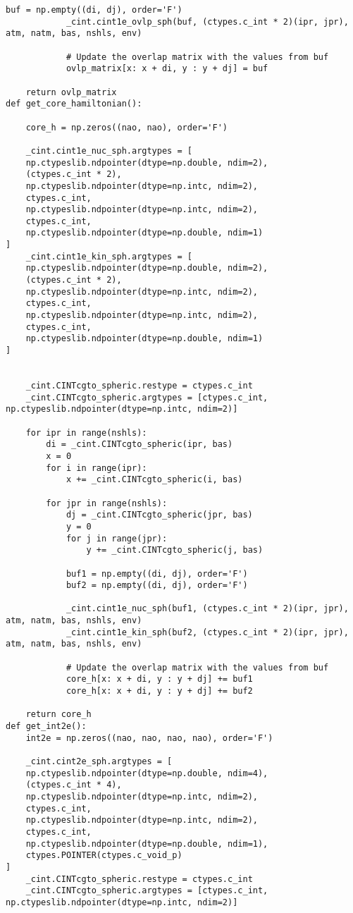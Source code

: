 \documentclass[12pt, a4paper, oneside]{ctexart}
\begin{document}
\begin{appendices}
\begin{lstlisting}[style = Python]
            buf = np.empty((di, dj), order='F')
            _cint.cint1e_ovlp_sph(buf, (ctypes.c_int * 2)(ipr, jpr), atm, natm, bas, nshls, env)

            # Update the overlap matrix with the values from buf
            ovlp_matrix[x: x + di, y : y + dj] = buf

    return ovlp_matrix
def get_core_hamiltonian():
    
    core_h = np.zeros((nao, nao), order='F')
    
    _cint.cint1e_nuc_sph.argtypes = [
    np.ctypeslib.ndpointer(dtype=np.double, ndim=2),
    (ctypes.c_int * 2),
    np.ctypeslib.ndpointer(dtype=np.intc, ndim=2),
    ctypes.c_int,
    np.ctypeslib.ndpointer(dtype=np.intc, ndim=2),
    ctypes.c_int,
    np.ctypeslib.ndpointer(dtype=np.double, ndim=1)
]
    _cint.cint1e_kin_sph.argtypes = [
    np.ctypeslib.ndpointer(dtype=np.double, ndim=2),
    (ctypes.c_int * 2),
    np.ctypeslib.ndpointer(dtype=np.intc, ndim=2),
    ctypes.c_int,
    np.ctypeslib.ndpointer(dtype=np.intc, ndim=2),
    ctypes.c_int,
    np.ctypeslib.ndpointer(dtype=np.double, ndim=1)
]
    

    _cint.CINTcgto_spheric.restype = ctypes.c_int
    _cint.CINTcgto_spheric.argtypes = [ctypes.c_int, np.ctypeslib.ndpointer(dtype=np.intc, ndim=2)]
    
    for ipr in range(nshls):
        di = _cint.CINTcgto_spheric(ipr, bas)
        x = 0
        for i in range(ipr):
            x += _cint.CINTcgto_spheric(i, bas)

        for jpr in range(nshls):
            dj = _cint.CINTcgto_spheric(jpr, bas)
            y = 0
            for j in range(jpr):
                y += _cint.CINTcgto_spheric(j, bas)

            buf1 = np.empty((di, dj), order='F')
            buf2 = np.empty((di, dj), order='F')
            
            _cint.cint1e_nuc_sph(buf1, (ctypes.c_int * 2)(ipr, jpr), atm, natm, bas, nshls, env)
            _cint.cint1e_kin_sph(buf2, (ctypes.c_int * 2)(ipr, jpr), atm, natm, bas, nshls, env)

            # Update the overlap matrix with the values from buf
            core_h[x: x + di, y : y + dj] += buf1
            core_h[x: x + di, y : y + dj] += buf2

    return core_h
def get_int2e():
    int2e = np.zeros((nao, nao, nao, nao), order='F')
    
    _cint.cint2e_sph.argtypes = [
    np.ctypeslib.ndpointer(dtype=np.double, ndim=4),
    (ctypes.c_int * 4),
    np.ctypeslib.ndpointer(dtype=np.intc, ndim=2),
    ctypes.c_int,
    np.ctypeslib.ndpointer(dtype=np.intc, ndim=2),
    ctypes.c_int,
    np.ctypeslib.ndpointer(dtype=np.double, ndim=1),
    ctypes.POINTER(ctypes.c_void_p)
]
    _cint.CINTcgto_spheric.restype = ctypes.c_int
    _cint.CINTcgto_spheric.argtypes = [ctypes.c_int, np.ctypeslib.ndpointer(dtype=np.intc, ndim=2)]
    

\end{lstlisting}
\end{appendices}
\end{document}
